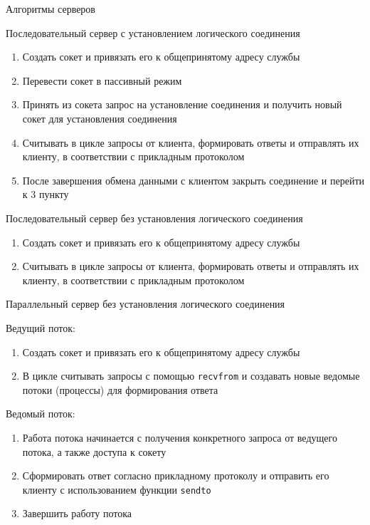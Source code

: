 \begin{frame}{}
	\Huge
	\begin{center}
		Алгоритмы серверов
	\end{center}
\end{frame}

\begin{frame}{Последовательный сервер с установлением логического соединения}

	\begin{enumerate}
		\item Создать сокет и привязать его к общепринятому адресу службы
		\item Перевести сокет в пассивный режим
		\item Принять из сокета запрос на установление соединения и получить новый сокет для установления соединения
		\item Считывать в цикле запросы от клиента,  формировать ответы и отправлять их клиенту,  в соответствии с прикладным протоколом
		\item После завершения обмена данными с клиентом закрыть соединение и перейти к 3 пункту
	\end{enumerate}
\end{frame}

\begin{frame}{Последовательный сервер без установления логического соединения}
	\begin{enumerate}
		\item Создать сокет и привязать его к общепринятому адресу службы
		\item Считывать в цикле запросы от клиента,  формировать ответы и отправлять их клиенту,  в соответствии с прикладным протоколом
	\end{enumerate}
\end{frame}

\begin{frame}{Параллельный сервер без установления логического соединения}

Ведущий поток:
	\begin{enumerate}
		\item Создать сокет и привязать его к общепринятому адресу службы
		\item В цикле считывать запросы с помощью {\tt recvfrom} и создавать новые ведомые потоки (процессы) для формирования ответа
	\end{enumerate}
\pause
Ведомый поток:
	\begin{enumerate}
		\item Работа потока начинается с получения конкретного запроса от ведущего потока,  а также доступа к сокету
		\item Сформировать ответ согласно прикладному протоколу и отправить его клиенту с использованием функции {\tt sendto}
		\item Завершить работу потока
	\end{enumerate}
\end{frame}

